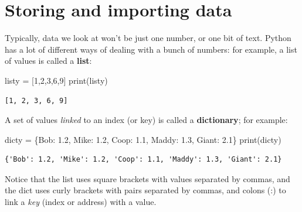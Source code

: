 \documentclass[
  letterpaper,
  DIV=11,
  numbers=noendperiod]{scrreprt}
\newenvironment{Shaded}{\begin{snugshade}}{\end{snugshade}}
\newcommand{\BuiltInTok}[1]{\textcolor[rgb]{0.00,0.23,0.31}{#1}}
\newcommand{\DecValTok}[1]{\textcolor[rgb]{0.68,0.00,0.00}{#1}}
\newcommand{\FloatTok}[1]{\textcolor[rgb]{0.68,0.00,0.00}{#1}}
\newcommand{\NormalTok}[1]{\textcolor[rgb]{0.00,0.23,0.31}{#1}}
\newcommand{\OperatorTok}[1]{\textcolor[rgb]{0.37,0.37,0.37}{#1}}
\newcommand{\StringTok}[1]{\textcolor[rgb]{0.13,0.47,0.30}{#1}}
\begin{document}
\hypertarget{storing-and-importing-data}{%
\section{Storing and importing data}\label{storing-and-importing-data}}

Typically, data we look at won't be just one number, or one bit of text.
Python has a lot of different ways of dealing with a bunch of numbers:
for example, a list of values is called a \textbf{list}:

\begin{Shaded}
\begin{Highlighting}[]
\NormalTok{listy }\OperatorTok{=}\NormalTok{ [}\DecValTok{1}\NormalTok{,}\DecValTok{2}\NormalTok{,}\DecValTok{3}\NormalTok{,}\DecValTok{6}\NormalTok{,}\DecValTok{9}\NormalTok{]}
\BuiltInTok{print}\NormalTok{(listy)}
\end{Highlighting}
\end{Shaded}

\begin{verbatim}
[1, 2, 3, 6, 9]
\end{verbatim}

A set of values \emph{linked} to an index (or key) is called a
\textbf{dictionary}; for example:

\begin{Shaded}
\begin{Highlighting}[]
\NormalTok{dicty }\OperatorTok{=}\NormalTok{ \{}\StringTok{\textquotesingle{}Bob\textquotesingle{}}\NormalTok{: }\FloatTok{1.2}\NormalTok{, }\StringTok{\textquotesingle{}Mike\textquotesingle{}}\NormalTok{: }\FloatTok{1.2}\NormalTok{, }\StringTok{\textquotesingle{}Coop\textquotesingle{}}\NormalTok{: }\FloatTok{1.1}\NormalTok{, }\StringTok{\textquotesingle{}Maddy\textquotesingle{}}\NormalTok{: }\FloatTok{1.3}\NormalTok{, }\StringTok{\textquotesingle{}Giant\textquotesingle{}}\NormalTok{: }\FloatTok{2.1}\NormalTok{\}}
\BuiltInTok{print}\NormalTok{(dicty)}
\end{Highlighting}
\end{Shaded}

\begin{verbatim}
{'Bob': 1.2, 'Mike': 1.2, 'Coop': 1.1, 'Maddy': 1.3, 'Giant': 2.1}
\end{verbatim}

Notice that the list uses square brackets with values separated by
commas, and the dict uses curly brackets with pairs separated by commas,
and colons (:) to link a \emph{key} (index or address) with a value.
\end{document}
